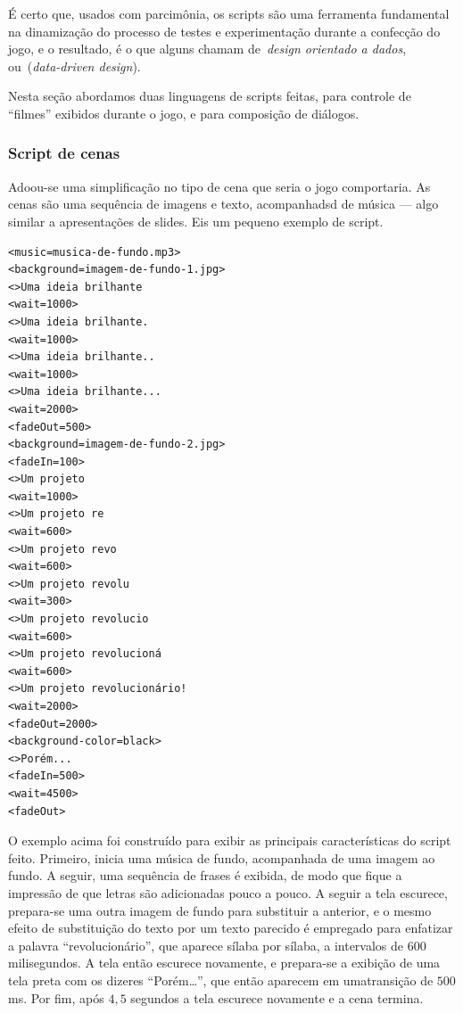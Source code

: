 É certo que, usados com parcimônia, os scripts são uma ferramenta
fundamental na dinamização do processo de testes e experimentação
durante a confecção do jogo, e o resultado, é o que alguns chamam
de~\emph{design orientado a dados}, ou~(\emph{data-driven design}).

Nesta seção abordamos duas linguagens de scripts feitas, para controle
de ``filmes'' exibidos durante o jogo, e para composição de diálogos.

\subsubsection{Script de cenas}

Adoou-se uma simplificação no tipo de cena que seria o jogo
comportaria. As cenas são uma sequência de imagens e texto,
acompanhadsd de música --- algo similar a apresentações de slides. Eis
um pequeno exemplo de script.

{\centering
\footnotesize
\begin{verbatim}
<music=musica-de-fundo.mp3>
<background=imagem-de-fundo-1.jpg>
<>Uma ideia brilhante
<wait=1000>
<>Uma ideia brilhante.
<wait=1000>
<>Uma ideia brilhante..
<wait=1000>
<>Uma ideia brilhante...
<wait=2000>
<fadeOut=500>
<background=imagem-de-fundo-2.jpg>
<fadeIn=100>
<>Um projeto
<wait=1000>
<>Um projeto re
<wait=600>
<>Um projeto revo
<wait=600>
<>Um projeto revolu
<wait=300>
<>Um projeto revolucio
<wait=600>
<>Um projeto revolucioná
<wait=600>
<>Um projeto revolucionário!
<wait=2000>
<fadeOut=2000>
<background-color=black>
<>Porém...
<fadeIn=500>
<wait=4500>
<fadeOut>
\end{verbatim}
}

O exemplo acima foi construído para exibir as principais
características do script feito. Primeiro, inicia uma música de fundo,
acompanhada de uma imagem ao fundo. A seguir, uma sequência de frases
é exibida, de modo que fique a impressão de que letras são adicionadas
pouco a pouco. A seguir a tela escurece, prepara-se uma outra imagem
de fundo para substituir a anterior, e o mesmo efeito de substituição
do texto por um texto parecido é empregado para enfatizar a palavra
``revolucionário'', que aparece sílaba por sílaba, a intervalos de
$600$ milisegundos. A tela então escurece novamente, e prepara-se a
exibição de uma tela preta com os dizeres ``Porém\ldots'', que então
aparecem em umatransição de $500$ms. Por fim, após $4,5$ segundos a
tela escurece novamente e a cena termina.

